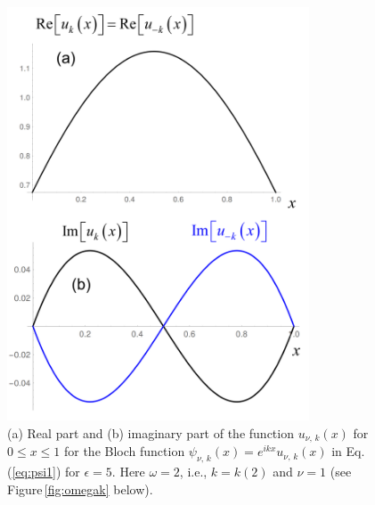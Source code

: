 \begin{figure}
    \centering
    \includegraphics[width=0.8\textwidth, keepaspectratio]{figures/system/u.png}
    \caption{(a) Real part and (b) imaginary part of the function $u_{\nu,\,k}(x)$ 
    for $0 \le x \le 1$ for the Bloch function 
    $\psi_{\nu,\,k}(x) = e^{i k x} u_{\nu,\,k}(x)$ in Eq.\,(\ref{eq:psi1}) for $\epsilon=5$. 
    Here $\omega=2$, i.e., $k = k(2)$ and $\nu=1$ (see Figure\,\ref{fig:omegak} below).}
    \label{fig:u}
\end{figure}

